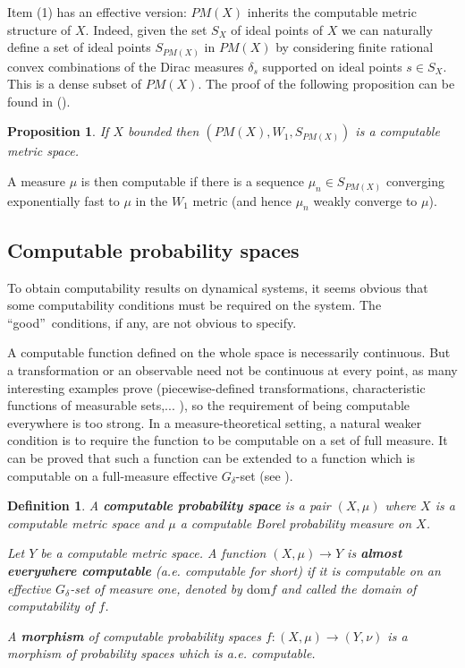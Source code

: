 \documentclass[copyright,creativecommons]{eptcs}
\newtheorem{definition}{Definition}
\newtheorem{proposition}{Proposition}
\numberwithin{equation}{section}
\begin{document}
Item (1) has an effective version: $PM(X)$ inherits the computable metric
structure of $X$. Indeed, given the set $S _{X}$ of ideal points of $X$ we
can naturally define a set of ideal points $S _{PM(X)}$ in $PM(X)$ by
considering finite rational convex combinations of the Dirac measures $\delta _{s}$ supported on ideal points $s\in S_{X}$. This is a dense subset
of $PM(X)$. The proof of the following proposition can be found in (\cite {HR07}).

\begin{proposition}
If $X$ bounded then $(PM(X),W_1, S _{PM(X)})$ is a computable metric space.
\end{proposition}

A measure $\mu $ is then computable if there is a sequence $\mu _{n}\in S_{PM(X)}$ converging exponentially fast to $\mu $ in the $W_{1}$ metric (and
hence $\mu _{n}$ weakly converge to $\mu $).

\subsection{Computable probability spaces}

To obtain computability results on dynamical systems, it seems obvious that
some computability conditions must be required on the system. The
\textquotedblleft good\textquotedblright\ conditions, if any, are not
obvious to specify.

A computable function defined on the whole space is necessarily continuous.
But a transformation or an observable need not be continuous at every point,
as many interesting examples prove (piecewise-defined transformations,
characteristic functions of measurable sets,... ), so the requirement of
being computable everywhere is too strong. In a measure-theoretical setting,
a natural weaker condition is to require the function to be computable on a
set of full measure. It can be proved that such a function can be extended
to a function which is computable on a full-measure effective $G_{\delta }$-set (see \cite{HR07, Hoy08}).

\begin{definition}
\label{a.e.compufunct}A \textbf{\emph{computable probability space}} is a
pair $(X,\mu )$ where $X$ is a computable metric space and $\mu $ a
computable Borel probability measure on $X$.

Let $Y$ be a computable metric space. A function $(X,\mu )\rightarrow Y$ is
\textbf{\emph{almost everywhere computable}} (a.e. computable for short) if
it is computable on an effective $G_{\delta }$-set of measure one, denoted
by $\mathrm{dom}f$ and called the \emph{domain of computability of $f$}.

A \textbf{\emph{morphism}} of computable probability spaces $f:(X,\mu)\to(Y,\nu)$ is a morphism of probability spaces which is a.e.
computable.
\end{definition}
\end{document}
